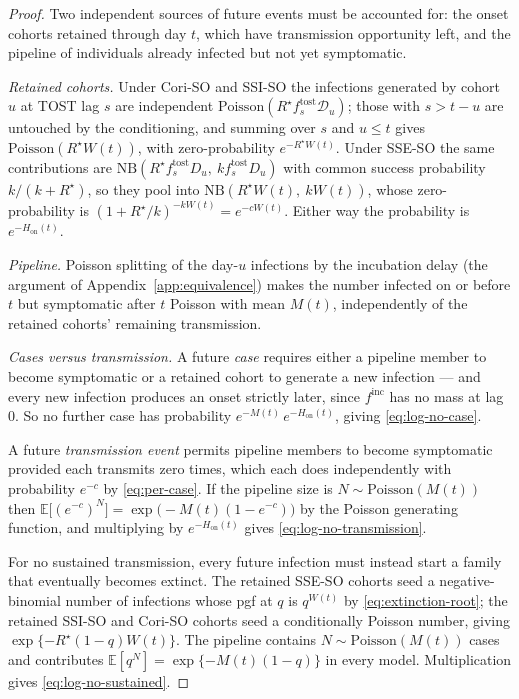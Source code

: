 \documentclass[11pt,a4paper]{article}
\theoremstyle{plain}
\theoremstyle{definition}
\newcommand{\Rreset}{R^{\star}}
\newcommand{\ftost}{f^{\mathrm{tost}}}
\newcommand{\finc}{f^{\mathrm{inc}}}
\newcommand{\NB}{\mathrm{NB}}
\newcommand{\Pois}{\mathrm{Poisson}}
\newcommand{\sseso}{SSE-SO}
\newcommand{\ssiso}{SSI-SO}
\newcommand{\coriso}{Cori-SO}
\begin{document}
\begin{proof}
Two independent sources of future events must be accounted for: the onset cohorts retained
through day $t$, which have transmission opportunity left, and the pipeline of individuals
already infected but not yet symptomatic.

\emph{Retained cohorts.} Under \coriso{} and \ssiso{} the infections generated by cohort $u$ at
TOST lag $s$ are independent $\Pois(\Rreset \ftost_s \mathcal{D}_u)$; those with $s > t-u$ are
untouched by the conditioning, and summing over $s$ and $u \le t$ gives
$\Pois(\Rreset W(t))$, with zero-probability $e^{-\Rreset W(t)}$. Under \sseso{} the same
contributions are $\NB(\Rreset\ftost_s D_u,\ k\ftost_s D_u)$ with common success probability
$k/(k+\Rreset)$, so they pool into $\NB(\Rreset W(t),\ kW(t))$, whose zero-probability is
$(1+\Rreset/k)^{-kW(t)} = e^{-cW(t)}$. Either way the probability is
$e^{-H_{\mathrm{on}}(t)}$.

\emph{Pipeline.} Poisson splitting of the day-$u$ infections by the incubation delay (the
argument of Appendix~\ref{app:equivalence}) makes the number infected on or before $t$ but
symptomatic after $t$ Poisson with mean $M(t)$, independently of the retained cohorts' remaining
transmission.

\emph{Cases versus transmission.}
A future \emph{case} requires either a pipeline member to become symptomatic or a retained
cohort to generate a new infection --- and every new infection produces an onset strictly later,
since $\finc$ has no mass at lag~$0$. So no further case has probability
$e^{-M(t)}\,e^{-H_{\mathrm{on}}(t)}$, giving \eqref{eq:log-no-case}.

A future \emph{transmission event} permits pipeline members to become symptomatic provided each
transmits zero times, which each does independently with probability $e^{-c}$ by
\eqref{eq:per-case}. If the pipeline size is $N \sim \Pois(M(t))$ then
$\mathbb{E}\bigl[(e^{-c})^{N}\bigr] = \exp\bigl(-M(t)(1-e^{-c})\bigr)$ by the Poisson generating
function, and multiplying by $e^{-H_{\mathrm{on}}(t)}$ gives
\eqref{eq:log-no-transmission}.

For no sustained transmission, every future infection must instead start a family that
eventually becomes extinct. The retained \sseso{} cohorts seed a negative-binomial number of
infections whose pgf at $q$ is $q^{W(t)}$ by \eqref{eq:extinction-root}; the retained \ssiso{}
and \coriso{} cohorts seed a conditionally Poisson number, giving
$\exp\{-\Rreset(1-q)W(t)\}$. The pipeline contains $N\sim\Pois(M(t))$ cases and contributes
$\mathbb{E}[q^N]=\exp\{-M(t)(1-q)\}$ in every model. Multiplication gives
\eqref{eq:log-no-sustained}.
\end{proof}
\end{document}
